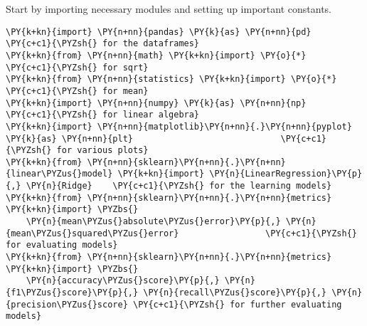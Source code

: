 Start by importing necessary modules and setting up important constants.

    \begin{tcolorbox}[breakable, size=fbox, boxrule=1pt, pad at break*=1mm,colback=cellbackground, colframe=cellborder]
\begin{Verbatim}[commandchars=\\\{\}]
\PY{k+kn}{import} \PY{n+nn}{pandas} \PY{k}{as} \PY{n+nn}{pd}                                         \PY{c+c1}{\PYZsh{} for the dataframes}
\PY{k+kn}{from} \PY{n+nn}{math} \PY{k+kn}{import} \PY{o}{*}                                          \PY{c+c1}{\PYZsh{} for sqrt}
\PY{k+kn}{from} \PY{n+nn}{statistics} \PY{k+kn}{import} \PY{o}{*}                                    \PY{c+c1}{\PYZsh{} for mean}
\PY{k+kn}{import} \PY{n+nn}{numpy} \PY{k}{as} \PY{n+nn}{np}                                          \PY{c+c1}{\PYZsh{} for linear algebra}
\PY{k+kn}{import} \PY{n+nn}{matplotlib}\PY{n+nn}{.}\PY{n+nn}{pyplot} \PY{k}{as} \PY{n+nn}{plt}                             \PY{c+c1}{\PYZsh{} for various plots}
\PY{k+kn}{from} \PY{n+nn}{sklearn}\PY{n+nn}{.}\PY{n+nn}{linear\PYZus{}model} \PY{k+kn}{import} \PY{n}{LinearRegression}\PY{p}{,} \PY{n}{Ridge}    \PY{c+c1}{\PYZsh{} for the learning models}
\PY{k+kn}{from} \PY{n+nn}{sklearn}\PY{n+nn}{.}\PY{n+nn}{metrics} \PY{k+kn}{import} \PYZbs{}
    \PY{n}{mean\PYZus{}absolute\PYZus{}error}\PY{p}{,} \PY{n}{mean\PYZus{}squared\PYZus{}error}                 \PY{c+c1}{\PYZsh{} for evaluating models}
\PY{k+kn}{from} \PY{n+nn}{sklearn}\PY{n+nn}{.}\PY{n+nn}{metrics} \PY{k+kn}{import} \PYZbs{}
    \PY{n}{accuracy\PYZus{}score}\PY{p}{,} \PY{n}{f1\PYZus{}score}\PY{p}{,} \PY{n}{recall\PYZus{}score}\PY{p}{,} \PY{n}{precision\PYZus{}score} \PY{c+c1}{\PYZsh{} for further evaluating models}
\end{Verbatim}
\end{tcolorbox}

